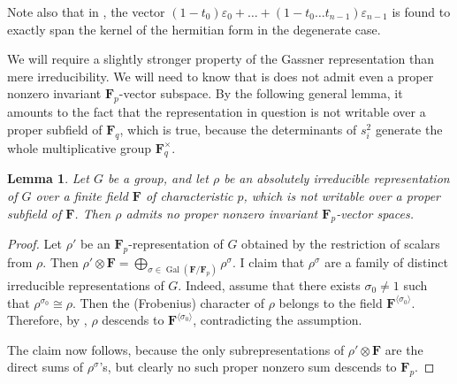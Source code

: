 \documentclass{article}
\newtheorem{lemma}{Lemma}
\theoremstyle{definition}
\DeclareMathOperator{\Gal}{\mathrm{Gal}}
\begin{document}
	Note also that in \cite[section 5.1]{cyclic}, the vector $(1-t_0)\varepsilon_0 + \ldots + (1-t_0 \ldots t_{n-1}) \varepsilon_{n-1}$ is found to exactly span the kernel of the hermitian form in the degenerate case. \par 
	We will require a slightly stronger property of the Gassner representation than mere irreducibility. We will need to know that is does not admit even a proper nonzero invariant $\mathbf{F}_p$-vector subspace. By the following general lemma, it amounts to the fact that the representation in question is not writable over a proper subfield of $\mathbf{F}_q$, which is true, because the determinants of $s_i^2$ generate the whole multiplicative group $\mathbf{F}_q^{\times}$.
	\begin{lemma} \label{invaddsubgp}
		Let $G$ be a group, and let $\rho$ be an absolutely irreducible representation of $G$ over a finite field $\mathbf{F}$ of characteristic $p$, which is not writable over a proper subfield of $\mathbf{F}$. Then $\rho$ admits no proper nonzero invariant $\mathbf{F}_p$-vector spaces.
	\end{lemma}
	\begin{proof}
		Let $\rho'$ be an $\mathbf{F}_p$-representation of $G$ obtained by the restriction of scalars from $\rho$. Then $\rho' \otimes \mathbf{F} = \bigoplus_{\sigma \in \Gal(\mathbf{F}/\mathbf{F}_p)} \rho^{\sigma}$. I claim that $\rho^{\sigma}$ are a family of distinct irreducible representations of $G$. Indeed, assume that there exists $\sigma_0 \neq 1$ such that $\rho^{\sigma_0} \cong \rho$. Then the (Frobenius) character of $\rho$ belongs to the field $\mathbf{F}^{\langle \sigma_0 \rangle}$. Therefore, by \cite[theorem 9.14]{isaacs}, $\rho$ descends to $\mathbf{F}^{\langle \sigma_0 \rangle}$, contradicting the assumption. \par
		The claim now follows, because the only subrepresentations of $\rho' \otimes \mathbf{F}$ are the direct sums of $\rho^{\sigma}$'s, but clearly no such proper nonzero sum descends to $\mathbf{F}_p$.
	\end{proof}
\end{document}
